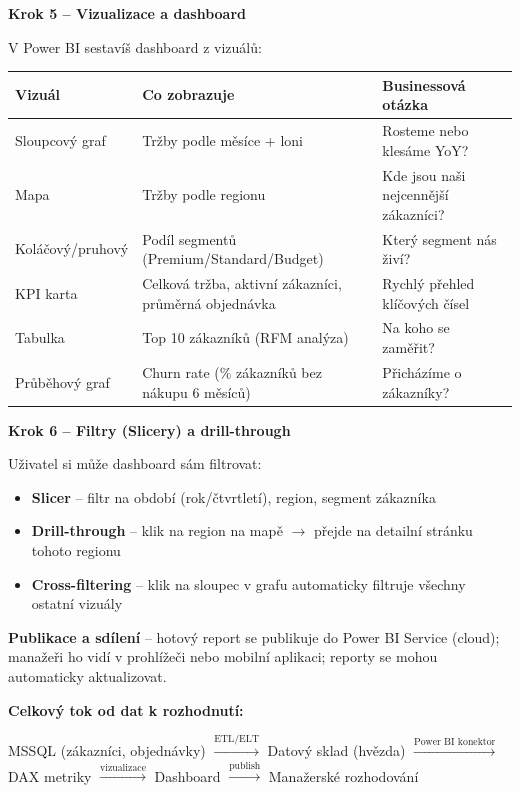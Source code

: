 \textbf{Krok 5 -- Vizualizace a dashboard}

V Power BI sestavíš dashboard z vizuálů:

\begin{center}
\begin{tabular}{p{3.5cm}p{4cm}p{5cm}}
\toprule
\textbf{Vizuál} & \textbf{Co zobrazuje} & \textbf{Businessová otázka} \\
\midrule
Sloupcový graf & Tržby podle měsíce + loni & Rosteme nebo klesáme YoY? \\
Mapa & Tržby podle regionu & Kde jsou naši nejcennější zákazníci? \\
Koláčový/pruhový & Podíl segmentů (Premium/Standard/Budget) & Který segment nás živí? \\
KPI karta & Celková tržba, aktivní zákazníci, průměrná objednávka & Rychlý přehled klíčových čísel \\
Tabulka & Top 10 zákazníků (RFM analýza) & Na koho se zaměřit? \\
Průběhový graf & Churn rate (\% zákazníků bez nákupu 6 měsíců) & Přicházíme o zákazníky? \\
\bottomrule
\end{tabular}
\end{center}

\textbf{Krok 6 -- Filtry (Slicery) a drill-through}

Uživatel si může dashboard sám filtrovat:
\begin{itemize}
  \item \textbf{Slicer} -- filtr na období (rok/čtvrtletí), region, segment zákazníka
  \item \textbf{Drill-through} -- klik na region na mapě $\to$ přejde na detailní stránku tohoto regionu
  \item \textbf{Cross-filtering} -- klik na sloupec v grafu automaticky filtruje všechny ostatní vizuály
\end{itemize}

\textbf{Publikace a sdílení} -- hotový report se publikuje do Power BI Service (cloud);
manažeři ho vidí v prohlížeči nebo mobilní aplikaci; reporty se mohou automaticky aktualizovat.

\medskip
\textbf{Celkový tok od dat k rozhodnutí:}

\begin{center}
\small
MSSQL (zákazníci, objednávky) $\xrightarrow{\text{ETL/ELT}}$
Datový sklad (hvězda) $\xrightarrow{\text{Power BI konektor}}$
DAX metriky $\xrightarrow{\text{vizualizace}}$
Dashboard $\xrightarrow{\text{publish}}$
Manažerské rozhodování
\end{center}


